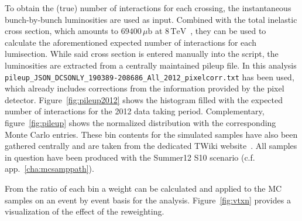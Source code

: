 {To obtain the (true) number of interactions for each crossing, the instantaneous bunch-by-bunch luminosities are used as input. Combined with the total inelastic cross section, which amounts to $69400\,\mu\text{b}$ at $8\,\text{TeV}$~\cite{pileup}, they can be used to calculate the aforementioned expected number of interactions for each lumisection. While said cross section is entered manually into the script, the luminosities are extracted from a centrally maintained pileup file. In this analysis \verb+pileup_JSON_DCSONLY_190389-208686_All_2012_pixelcorr.txt+ has been used, which already includes corrections from the information provided by the pixel detector. Figure~\ref{fig:pileup2012} shows the histogram filled with the expected number of interactions for the 2012 data taking period. Complementary, figure~\ref{fig:pileup} shows the normalized distribution with the corresponding Monte Carlo entries. These bin contents for the simulated samples have also been gathered centrally and are taken from the dedicated TWiki website~\cite{pileupmc}. All samples in question have been produced with the Summer12 S10 scenario (c.f. app.~\ref{cha:mcsamppath}).

From the ratio of each bin a weight can be calculated and applied to the MC samples on an event by event basis for the analysis. Figure~\ref{fig:vtxn} provides a visualization of the effect of the reweighting.

}
